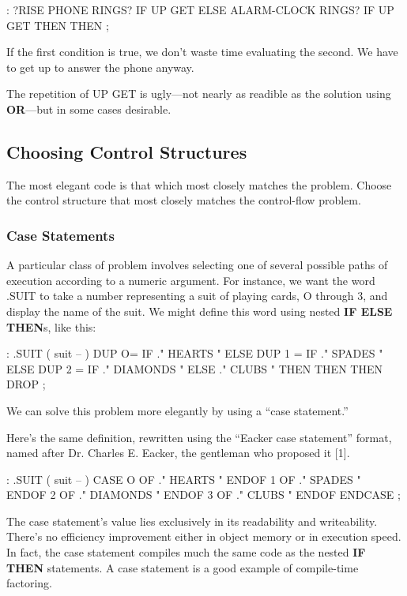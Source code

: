 \begin{Code}
: ?RISE   PHONE RINGS? IF  UP GET  ELSE
     ALARM-CLOCK RINGS?  IF UP GET THEN THEN  ;
\end{Code}
If the first condition is true, we don't waste time evaluating the second.
We have to get up to answer the phone anyway.

The repetition of UP GET is ugly---not nearly as readible as the
solution using \textbf{OR}---but in some cases desirable.

\subsection{Choosing Control Structures}
\begin{tip}
The most elegant code is that which most closely matches the problem.
Choose the control structure that most closely matches the control-flow
problem.
\end{tip}
\subsubsection{Case Statements}

A particular class of problem involves selecting one of several possible
paths of execution according to a numeric argument. For instance, we
want the word .SUIT to take a number representing a suit of playing
cards, O through 3, and display the name of the suit. We might define this
word using nested \textbf{IF ELSE THEN}s, like this:

\begin{Code}
: .SUIT ( suit -- )
  DUP  O=  IF ." HEARTS "   ELSE
  DUP  1 = IF ." SPADES "   ELSE
  DUP  2 = IF ." DIAMONDS " ELSE
              ." CLUBS "
  THEN THEN THEN  DROP ;
\end{Code}
We can solve this problem more elegantly by using a ``case statement.''

Here's the same definition, rewritten using the ``Eacker case statement''
format, named after Dr. Charles E. Eacker, the gentleman who proposed
it [1].

\begin{Code}
: .SUIT ( suit -- )
  CASE
  O OF   ." HEARTS "    ENDOF
  1 OF   ." SPADES "    ENDOF
  2 OF   ." DIAMONDS "  ENDOF
  3 OF   ." CLUBS "     ENDOF     ENDCASE ;
\end{Code}
The case statement's value lies exclusively in its readability and
writeability. There's no efficiency improvement either in object memory
or in execution speed. In fact, the case statement compiles much the
same code as the nested \textbf{IF THEN} statements. A case statement is a
good example of compile-time factoring.

